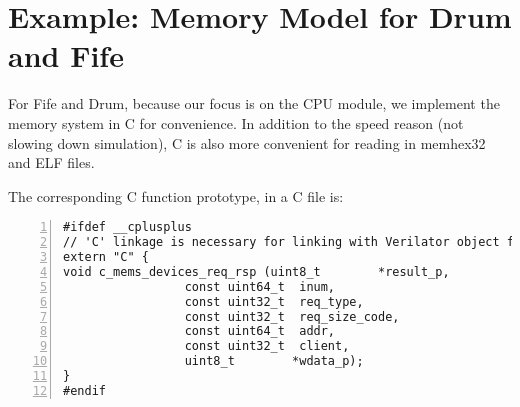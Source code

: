 \section{Example: Memory Model for Drum and Fife}

For Fife and Drum, because our focus is on the CPU module, we
implement the memory system in C for convenience.  In addition to the
speed reason (not slowing down simulation), C is also more convenient
for reading in memhex32 and ELF files.


The corresponding C function prototype, in a C file is:

{\footnotesize
\begin{Verbatim}[frame=single, numbers=left]
#ifdef __cplusplus
// 'C' linkage is necessary for linking with Verilator object files
extern "C" {
void c_mems_devices_req_rsp (uint8_t        *result_p,
			     const uint64_t  inum,
			     const uint32_t  req_type,
			     const uint32_t  req_size_code,
			     const uint64_t  addr,
			     const uint32_t  client,
			     uint8_t        *wdata_p);
}
#endif
\end{Verbatim}
}

